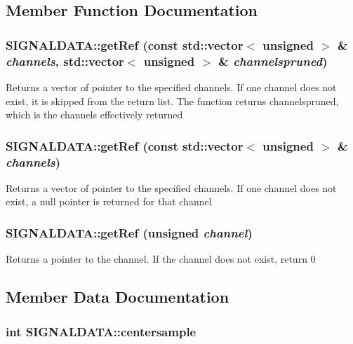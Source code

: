 \subsection{Member Function Documentation}
\hypertarget{class_s_i_g_n_a_l_d_a_t_a_ac54d48e555a7b8a7e12c927cc90f311}{
\subsubsection[{getRef}]{ SIGNALDATA::getRef (const std::vector$<$ unsigned $>$ \& {\em channels}, \/  std::vector$<$ unsigned $>$ \& {\em channelspruned})}}
\label{class_s_i_g_n_a_l_d_a_t_a_ac54d48e555a7b8a7e12c927cc90f311}


Returns a vector of pointer to the specified channels. If one channel does not exist, it is skipped from the return list. The function returns channelspruned, which is the channels effectively returned \hypertarget{class_s_i_g_n_a_l_d_a_t_a_ebd15e42c0384ffc5c4a74d317228145}{
\subsubsection[{getRef}]{ SIGNALDATA::getRef (const std::vector$<$ unsigned $>$ \& {\em channels})}}
\label{class_s_i_g_n_a_l_d_a_t_a_ebd15e42c0384ffc5c4a74d317228145}


Returns a vector of pointer to the specified channels. If one channel does not exist, a null pointer is returned for that channel \hypertarget{class_s_i_g_n_a_l_d_a_t_a_4b9e7478c234c6ced9b9a7d63c91c092}{
\subsubsection[{getRef}]{ SIGNALDATA::getRef (unsigned {\em channel})}}
\label{class_s_i_g_n_a_l_d_a_t_a_4b9e7478c234c6ced9b9a7d63c91c092}


Returns a pointer to the channel. If the channel does not exist, return 0 

\subsection{Member Data Documentation}
\hypertarget{class_s_i_g_n_a_l_d_a_t_a_02abe023620a84cd4cdee2f6b7e7e989}{
\subsubsection[{centersample}]{\setlength{\rightskip}{0pt plus 5cm}int {\bf SIGNALDATA::centersample}}}
\label{class_s_i_g_n_a_l_d_a_t_a_02abe023620a84cd4cdee2f6b7e7e989}


